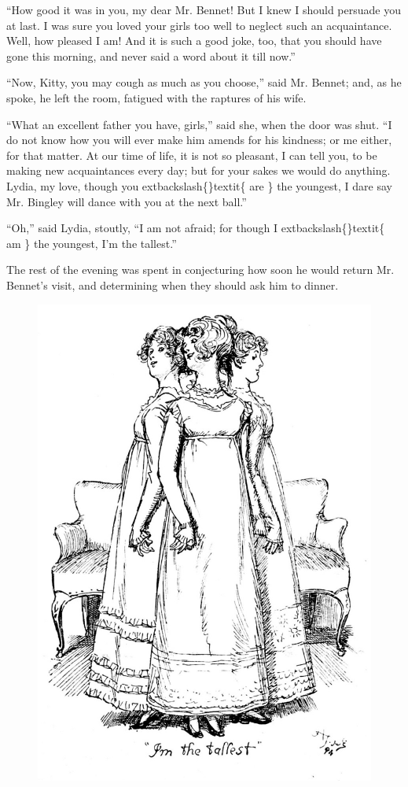 \documentclass[10pt]{book}
\begin{document}
   “How good it was in you, my dear Mr. Bennet! But I knew I should
persuade you at last. I was sure you loved your girls too well to
neglect such an acquaintance. Well, how pleased I am! And it is such a
good joke, too, that you should have gone this morning, and never said a
word about it till now.”
  

   “Now, Kitty, you may cough as much as you choose,” said Mr. Bennet; and,
as he spoke, he left the room, fatigued with the raptures of his wife.
  

   “What an excellent father you have, girls,” said she, when the door was
shut. “I do not know how you will ever make him amends for his kindness;
or me either, for that matter. At our time of life, it is not so
pleasant, I can tell you, to be making new acquaintances every day; but
for your sakes we would do anything. Lydia, my love, though you
   	extbackslash\{\}textit\{
    are
   \}
   the youngest, I dare say Mr. Bingley will dance with you at the next
ball.”
  

   “Oh,” said Lydia, stoutly, “I am not afraid; for though I
   	extbackslash\{\}textit\{
    am
   \}
   the
youngest, I’m the tallest.”
  

   The rest of the evening was spent in conjecturing how soon he would
return Mr. Bennet’s visit, and determining when they should ask him to
dinner.
  

\begin{figure}[h]
\centering
\includegraphics[width=\linewidth]{images/i_038.jpg}
\end{figure}
\end{document}
